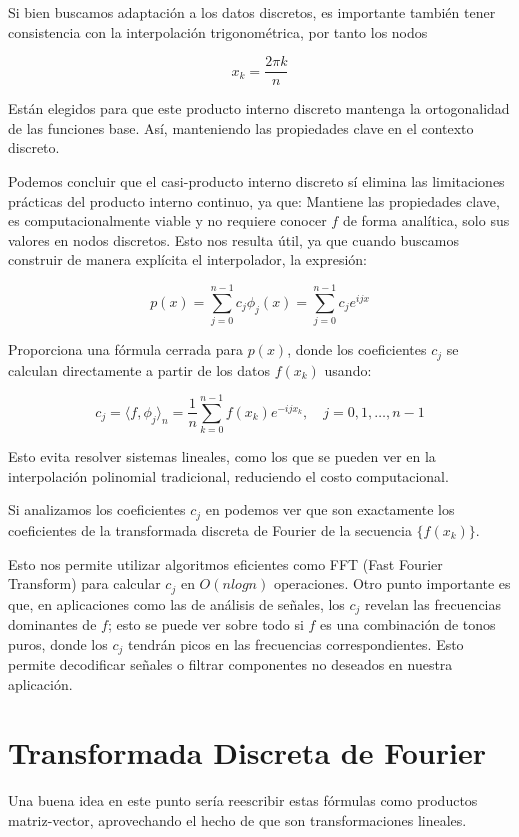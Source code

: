 \documentclass{article}
\begin{document}
Si bien buscamos adaptación a los datos discretos, es importante también tener consistencia con la interpolación trigonométrica, por tanto los nodos 

\[x_k = \frac{2\pi k}{n}\]

Están elegidos para que este producto interno discreto mantenga la ortogonalidad de las funciones base. Así, manteniendo las propiedades clave en el contexto discreto.

Podemos concluir que el casi-producto interno discreto sí elimina las limitaciones prácticas del producto interno continuo, ya que: Mantiene las propiedades clave, es computacionalmente viable y no requiere conocer \(f\)  de forma analítica, solo sus valores en nodos discretos.
Esto nos resulta útil, ya que cuando buscamos construir de manera explícita el interpolador, la expresión:

\[ p(x) = \sum_{j=0}^{n-1} c_j \phi_j(x) = \sum_{j=0}^{n-1} c_j e^{ijx} \]

Proporciona una fórmula cerrada para \(p(x)\), donde los coeficientes \(c_j\) se calculan directamente a partir de los datos \({f({x_k})}\) usando:

\[ c_j = \langle f, \phi_j \rangle_n = \frac{1}{n} \sum_{k=0}^{n-1} f(x_k) e^{-ijx_k}, \quad j = 0, 1, \dots, n-1 \]

Esto evita resolver sistemas lineales, como los que se pueden ver en la interpolación polinomial tradicional, reduciendo el costo computacional. 

Si analizamos los coeficientes \(c_j\) en podemos ver que son exactamente los coeficientes de la transformada discreta de Fourier de la secuencia \(\{ f(x_k) \}\). 

Esto nos permite utilizar algoritmos eficientes como FFT (Fast Fourier Transform) para calcular \(c_j\) en \(O(n log n)\) operaciones. Otro punto importante es que, en aplicaciones como las de análisis de señales, los \(c_j\) revelan las frecuencias dominantes de \(f\); esto se puede ver sobre todo si \(f\) es una combinación de tonos puros, donde los \(c_j\) tendrán picos en las frecuencias correspondientes. Esto permite decodificar señales o filtrar componentes no deseados en nuestra aplicación.

\section{Transformada Discreta de Fourier}

Una buena idea en este punto sería reescribir estas fórmulas como productos matriz-vector, aprovechando el hecho de que son transformaciones lineales.
\end{document}
